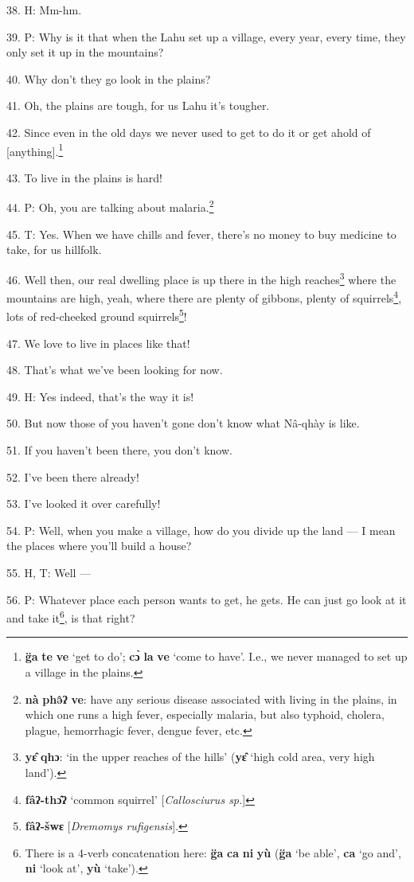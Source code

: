 38. H: Mm-hm.

39. P: Why is it that when the Lahu set up a village, every year, every time, they
only set it up in the mountains?

40. Why don't they go look in the plains?

41. Oh, the plains are tough, for us Lahu it's tougher.

42. Since even in the old days we never used to get to do it or get ahold of [anything].\footnote{\textbf{g̈a} \textbf{te} \textbf{ve} `get to do'; \textbf{cɔ̀} \textbf{la} \textbf{ve} `come to have'. I.e., we never managed to set up a village in the plains.}

43. To live in the plains is hard!

44. P: Oh, you are talking about malaria.\footnote{\textbf{nà} \textbf{phə̂ʔ} \textbf{ve}: have any serious disease associated with living in the plains, in which one runs a high fever, especially malaria, but also typhoid, cholera, plague, hemorrhagic fever, dengue fever, etc.}

45. T: Yes. When we have chills and fever, there's no money to buy medicine to
take, for us hillfolk.

46. Well then, our real dwelling place is up there in the high reaches\footnote{\textbf{yɛ̂} \textbf{qhɔ}: `in the upper reaches of the hills' (\textbf{yɛ̂} `high cold area, very high land').} where
the mountains are high, yeah, where there are plenty of gibbons, plenty of squirrels\footnote{\textbf{fâʔ-thɔ̂ʔ} `common squirrel' [\textit{Callosciurus sp.}]},
lots of red-cheeked ground squirrels\footnote{\textbf{fâʔ-šwɛ} [\textit{Dremomys rufigensis}].}!

47. We love to live in places like that!

48. That's what we've been looking for now.

49. H: Yes indeed, that's the way it is!

50. But now those of you haven't gone don't know what Nâ-qhày is like.

51. If you haven't been there, you don't know.

52. I've been there already!

53. I've looked it over carefully!

54. P: Well, when you make a village, how do you divide up the land --- I mean
the places where you'll build a house?

55. H, T: Well ---

56. P: Whatever place each person wants to get, he gets. He can just go look at
it and take it\footnote{There is a 4-verb concatenation here: \textbf{g̈a} \textbf{ca} \textbf{ni} \textbf{yù} (\textbf{g̈a} `be able', \textbf{ca} `go and', \textbf{ni} `look at', \textbf{yù} `take').}, is that right?

